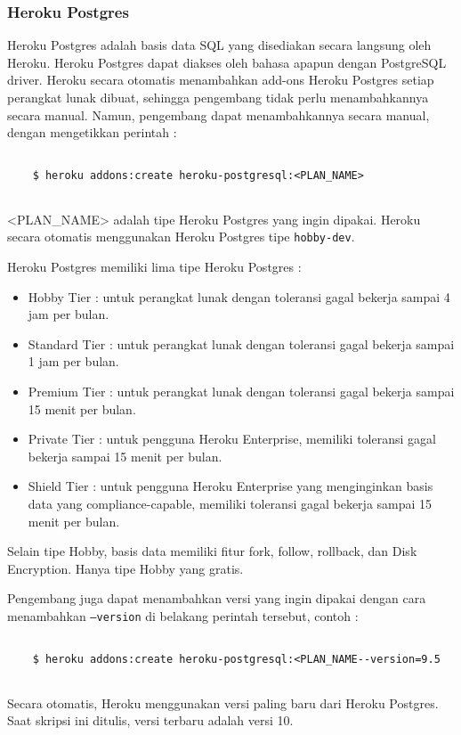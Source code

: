 \subsubsection{Heroku Postgres}
Heroku Postgres adalah basis data SQL yang disediakan secara langsung oleh Heroku. Heroku Postgres dapat diakses oleh bahasa apapun dengan PostgreSQL driver. Heroku secara otomatis menambahkan add-ons Heroku Postgres setiap perangkat lunak dibuat, sehingga pengembang tidak perlu menambahkannya secara manual. Namun, pengembang dapat menambahkannya secara manual, dengan mengetikkan perintah :
\begin{lstlisting}
	
	$ heroku addons:create heroku-postgresql:<PLAN_NAME>
	
\end{lstlisting}
<PLAN\_NAME> adalah tipe Heroku Postgres yang ingin dipakai. Heroku secara otomatis menggunakan Heroku Postgres tipe \texttt{hobby-dev}.

Heroku Postgres memiliki lima tipe Heroku Postgres :
\begin{itemize}
\item Hobby Tier : untuk perangkat lunak dengan toleransi gagal bekerja sampai 4 jam per bulan.
\item Standard Tier : untuk perangkat lunak dengan toleransi gagal bekerja sampai 1 jam per bulan.
\item Premium Tier : untuk perangkat lunak dengan toleransi gagal bekerja sampai 15 menit per bulan.
\item Private Tier : untuk pengguna Heroku Enterprise, memiliki toleransi gagal bekerja sampai 15 menit per bulan.
\item Shield Tier : untuk pengguna Heroku Enterprise yang menginginkan basis data yang compliance-capable, memiliki toleransi gagal bekerja sampai 15 menit per bulan.
\end{itemize}
Selain tipe Hobby, basis data memiliki fitur fork, follow, rollback, dan Disk Encryption. Hanya tipe Hobby yang gratis.

Pengembang juga dapat menambahkan versi yang ingin dipakai dengan cara menambahkan \texttt{--version} di belakang perintah tersebut, contoh :
\begin{lstlisting}
	
	$ heroku addons:create heroku-postgresql:<PLAN_NAME--version=9.5
	
\end{lstlisting}
Secara otomatis, Heroku menggunakan versi paling baru dari Heroku Postgres. Saat skripsi ini ditulis, versi terbaru adalah versi 10.

